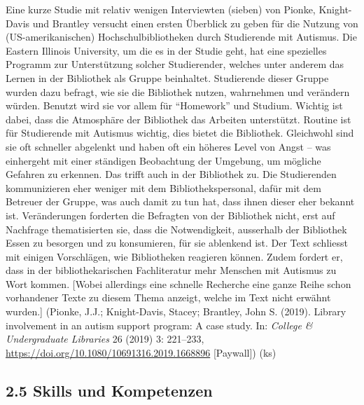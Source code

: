 \documentclass[a4paper,
fontsize=11pt,
oneside,
numbers=noperiodatend,
parskip=half-,
bibliography=totoc,
final
]{scrartcl}
\begin{document}
Eine kurze Studie mit relativ wenigen Interviewten (sieben) von Pionke,
Knight-Davis und Brantley versucht einen ersten Überblick zu geben für
die Nutzung von (US-amerikanischen) Hochschulbibliotheken durch
Studierende mit Autismus. Die Eastern Illinois University, um die es in
der Studie geht, hat eine spezielles Programm zur Unterstützung solcher
Studierender, welches unter anderem das Lernen in der Bibliothek als
Gruppe beinhaltet. Studierende dieser Gruppe wurden dazu befragt, wie
sie die Bibliothek nutzen, wahrnehmen und verändern würden. Benutzt wird
sie vor allem für \enquote{Homework} und Studium. Wichtig ist dabei,
dass die Atmosphäre der Bibliothek das Arbeiten unterstützt. Routine ist
für Studierende mit Autismus wichtig, dies bietet die Bibliothek.
Gleichwohl sind sie oft schneller abgelenkt und haben oft ein höheres
Level von Angst -- was einhergeht mit einer ständigen Beobachtung der
Umgebung, um mögliche Gefahren zu erkennen. Das trifft auch in der
Bibliothek zu. Die Studierenden kommunizieren eher weniger mit dem
Bibliothekspersonal, dafür mit dem Betreuer der Gruppe, was auch damit
zu tun hat, dass ihnen dieser eher bekannt ist. Veränderungen forderten
die Befragten von der Bibliothek nicht, erst auf Nachfrage
thematisierten sie, dass die Notwendigkeit, ausserhalb der Bibliothek
Essen zu besorgen und zu konsumieren, für sie ablenkend ist. Der Text
schliesst mit einigen Vorschlägen, wie Bibliotheken reagieren können.
Zudem fordert er, dass in der bibliothekarischen Fachliteratur mehr
Menschen mit Autismus zu Wort kommen. {[}Wobei allerdings eine schnelle
Recherche eine ganze Reihe schon vorhandener Texte zu diesem Thema
anzeigt, welche im Text nicht erwähnt wurden.{]} (Pionke, J.J.;
Knight-Davis, Stacey; Brantley, John S. (2019). Library involvement in
an autism support program: A case study. In: \emph{College \&
Undergraduate Libraries} 26 (2019) 3: 221--233,
\url{https://doi.org/10.1080/10691316.2019.1668896} {[}Paywall{]}) (ks)

\hypertarget{skills-und-kompetenzen}{%
\subsection{2.5 Skills und Kompetenzen}\label{skills-und-kompetenzen}}
\end{document}
